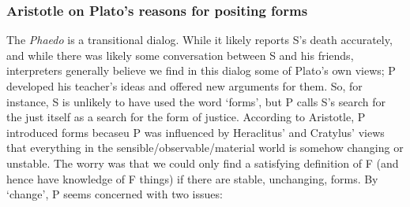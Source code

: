 \documentclass[oneside]{article}
\begin{document}
\subsubsection*{Aristotle on Plato's reasons for positing forms}
The \emph{Phaedo} is a transitional dialog. While it likely reports S's death accurately, and while there was likely some conversation between S and his friends, interpreters generally believe we find in this dialog some of Plato's own views; P developed his teacher's ideas and offered new arguments for them. So, for instance, S is unlikely to have used the word `forms', but P calls S's search for the just itself as a search for the form of justice. According to Aristotle, P introduced forms becaseu P was influenced by Heraclitus' and Cratylus' views that everything in the sensible/observable/material world is somehow changing or unstable. The worry was that we could only find a satisfying definition of F (and hence have knowledge of F things) if there are stable, unchanging, forms. By `change', P seems concerned with two issues: 
\end{document}
